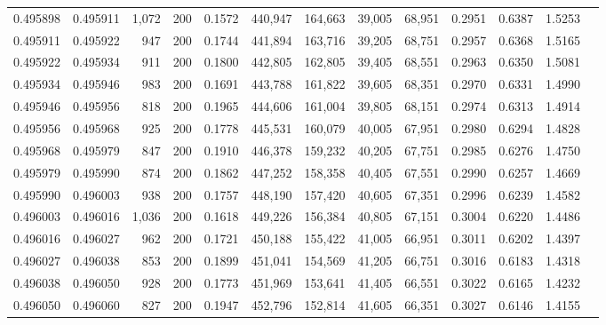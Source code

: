 \begin{tabular}{rrrrrrrrrrrrr}
0.495898 & 0.495911 &  1,072 & 200 &                                     0.1572 & 440,947 & 164,663 &  39,005 &  68,951 & 0.2951 & 0.6387 & 1.5253 \\
0.495911 & 0.495922 &    947 & 200 &                                     0.1744 & 441,894 & 163,716 &  39,205 &  68,751 & 0.2957 & 0.6368 & 1.5165 \\
0.495922 & 0.495934 &    911 & 200 &                                     0.1800 & 442,805 & 162,805 &  39,405 &  68,551 & 0.2963 & 0.6350 & 1.5081 \\
0.495934 & 0.495946 &    983 & 200 &                                     0.1691 & 443,788 & 161,822 &  39,605 &  68,351 & 0.2970 & 0.6331 & 1.4990 \\
0.495946 & 0.495956 &    818 & 200 &                                     0.1965 & 444,606 & 161,004 &  39,805 &  68,151 & 0.2974 & 0.6313 & 1.4914 \\
0.495956 & 0.495968 &    925 & 200 &                                     0.1778 & 445,531 & 160,079 &  40,005 &  67,951 & 0.2980 & 0.6294 & 1.4828 \\
0.495968 & 0.495979 &    847 & 200 &                                     0.1910 & 446,378 & 159,232 &  40,205 &  67,751 & 0.2985 & 0.6276 & 1.4750 \\
0.495979 & 0.495990 &    874 & 200 &                                     0.1862 & 447,252 & 158,358 &  40,405 &  67,551 & 0.2990 & 0.6257 & 1.4669 \\
0.495990 & 0.496003 &    938 & 200 &                                     0.1757 & 448,190 & 157,420 &  40,605 &  67,351 & 0.2996 & 0.6239 & 1.4582 \\
0.496003 & 0.496016 &  1,036 & 200 &                                     0.1618 & 449,226 & 156,384 &  40,805 &  67,151 & 0.3004 & 0.6220 & 1.4486 \\
0.496016 & 0.496027 &    962 & 200 &                                     0.1721 & 450,188 & 155,422 &  41,005 &  66,951 & 0.3011 & 0.6202 & 1.4397 \\
0.496027 & 0.496038 &    853 & 200 &                                     0.1899 & 451,041 & 154,569 &  41,205 &  66,751 & 0.3016 & 0.6183 & 1.4318 \\
0.496038 & 0.496050 &    928 & 200 &                                     0.1773 & 451,969 & 153,641 &  41,405 &  66,551 & 0.3022 & 0.6165 & 1.4232 \\
0.496050 & 0.496060 &    827 & 200 &                                     0.1947 & 452,796 & 152,814 &  41,605 &  66,351 & 0.3027 & 0.6146 & 1.4155 \\

\end{tabular}
